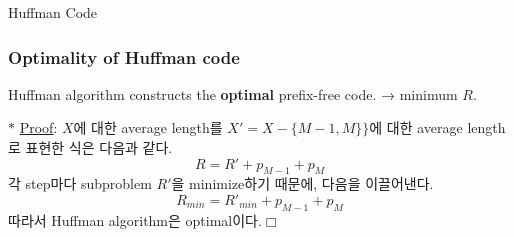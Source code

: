 \documentclass[9pt]{beamer}
\begin{document}
\begin{section}{Huffman Code}
        \begin{frame}
            \frametitle{Optimality of Huffman code}
            \begin{lemma}
                    Huffman algorithm constructs the \textbf{optimal} prefix-free code. → minimum $R$.
            \end{lemma}
            \vspace{0.2cm}
            $\ast$ \underline{Proof}: $X$에 대한 average length를 $X'=X-\{M-1, M\}\}$에 대한 average length로 표현한 식은 다음과 같다.
            $$R = R' + p_{M-1} + p_M$$
            각 step마다 subproblem $R'$을 minimize하기 때문에, 다음을 이끌어낸다.
            $$R_{min} = R'_{min} + p_{M-1} + p_M$$
            따라서 Huffman algorithm은 optimal이다.$\Box$
        \end{frame}
    \end{section}
\end{document}
